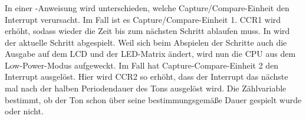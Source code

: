 \subsubsection{} %
\label{ssub:__interrupt_void_ton_umschalten}
In einer -Anweisung wird unterschieden, welche Capture/Compare-Einheit den Interrupt verursacht.
\newline
Im Fall  ist es Capture/Compare-Einheit 1. CCR1 wird erhöht, sodass wieder die Zeit bis zum nächsten Schritt ablaufen muss. In  wird der aktuelle Schritt abgespielt. Weil sich beim Abspielen der Schritte auch die Ausgabe auf dem LCD und der LED-Matrix ändert, wird nun die CPU aus dem Low-Power-Modus aufgeweckt.
\newline
Im Fall  hat Capture-Compare-Einheit 2 den Interrupt ausgelöst. Hier wird CCR2 so erhöht, dass der Interrupt das nächste mal nach der halben Periodendauer des Tons ausgelöst wird. Die Zählvariable  bestimmt, ob der Ton schon über seine bestimmungsgemäße Dauer gespielt wurde oder nicht.
